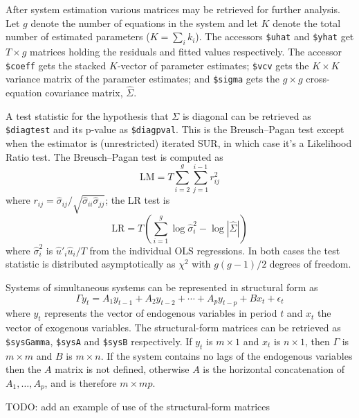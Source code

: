 After system estimation various matrices may be retrieved for further
analysis.  Let $g$ denote the number of equations in the system and
let $K$ denote the total number of estimated parameters ($K = \sum_i
k_i$). The accessors \verb|$uhat| and \verb|$yhat| get $T \times g$
matrices holding the residuals and fitted values respectively. The
accessor \verb|$coeff| gets the stacked $K$-vector of parameter
estimates; \verb|$vcv| gets the $K \times K$ variance matrix of the
parameter estimates; and \verb|$sigma| gets the $g \times g$
cross-equation covariance matrix, $\hat{\Sigma}$.

A test statistic for the hypothesis that $\Sigma$ is diagonal can be
retrieved as \verb|$diagtest| and its p-value as
\verb|$diagpval|. This is the Breusch--Pagan test except when the
estimator is (unrestricted) iterated SUR, in which case it's a
Likelihood Ratio test. The Breusch--Pagan test is computed as
\[
\mbox{LM} = T \sum_{i=2}^g \sum_{j=1}^{i-1} r^2_{ij}
\]
where $r_{ij} = \hat{\sigma}_{ij} /
\sqrt{\hat{\sigma}_{ii}\hat{\sigma}_{jj}}$; the LR test is
\[
\mbox{LR} = T \left(\sum_{i=1}^g \log \hat{\sigma}^2_i -\log 
 |\hat{\Sigma}| \right)
\]
where $\hat{\sigma}^2_i$ is $\hat{u}'_i \hat{u}_i / T$ from the
individual OLS regressions. In both cases the test statistic is
distributed asymptotically as $\chi^2$ with $g(g-1)/2$ degrees of
freedom. 

Systems of simultaneous systems can be represented in structural form
as
\[
\Gamma y_t = A_1 y_{t-1} + A_2 y_{t-2} + \cdots + A_p y_{t-p}
 + B x_t + \epsilon_t
\]
where $y_t$ represents the vector of endogenous variables in period
$t$ and $x_t$ the vector of exogenous variables.  The structural-form
matrices can be retrieved as \verb|$sysGamma|, \verb|$sysA| and
\verb|$sysB| respectively. If $y_t$ is $m \times 1$ and $x_t$ is $n
\times 1$, then $\Gamma$ is $m \times m$ and $B$ is $m \times n$. If
the system contains no lags of the endogenous variables then the $A$
matrix is not defined, otherwise $A$ is the horizontal concatenation
of $A_1,\dots,A_p$, and is therefore $m \times mp$.

TODO: add an example of use of the structural-form matrices


